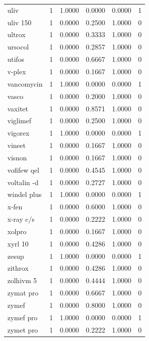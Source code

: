\begin{longtable}{p{3.0cm}rrrrr}
uliv & 1 & 1.0000 & 0.0000 & 0.0000 & 1 \\
uliv 150 & 1 & 0.0000 & 0.2500 & 1.0000 & 0 \\
ultrox & 1 & 0.0000 & 0.3333 & 1.0000 & 0 \\
ursocol & 1 & 0.0000 & 0.2857 & 1.0000 & 0 \\
utifos & 1 & 0.0000 & 0.6667 & 1.0000 & 0 \\
v-plex & 1 & 0.0000 & 0.1667 & 1.0000 & 0 \\
vancomycin & 1 & 1.0000 & 0.0000 & 0.0000 & 1 \\
vasco & 1 & 0.0000 & 0.2000 & 1.0000 & 0 \\
vaxitet & 1 & 0.0000 & 0.8571 & 1.0000 & 0 \\
viglimef & 1 & 0.0000 & 0.2500 & 1.0000 & 0 \\
vigorex & 1 & 1.0000 & 0.0000 & 0.0000 & 1 \\
vineet & 1 & 0.0000 & 0.1667 & 1.0000 & 0 \\
visnon & 1 & 0.0000 & 0.1667 & 1.0000 & 0 \\
vofifew qel & 1 & 0.0000 & 0.4545 & 1.0000 & 0 \\
voltalin -d & 1 & 0.0000 & 0.2727 & 1.0000 & 0 \\
windel plus & 1 & 1.0000 & 0.0000 & 0.0000 & 1 \\
x-fen & 1 & 0.0000 & 0.6000 & 1.0000 & 0 \\
x-ray c/s & 1 & 0.0000 & 0.2222 & 1.0000 & 0 \\
xolpro & 1 & 0.0000 & 0.1667 & 1.0000 & 0 \\
xyrl 10 & 1 & 0.0000 & 0.4286 & 1.0000 & 0 \\
zesup & 1 & 1.0000 & 0.0000 & 0.0000 & 1 \\
zithrox & 1 & 0.0000 & 0.4286 & 1.0000 & 0 \\
zolhivm 5 & 1 & 0.0000 & 0.4444 & 1.0000 & 0 \\
zymat pro & 1 & 0.0000 & 0.6667 & 1.0000 & 0 \\
zymef & 1 & 0.0000 & 0.8000 & 1.0000 & 0 \\
zymef pro & 1 & 1.0000 & 0.0000 & 0.0000 & 1 \\
zymet pro & 1 & 0.0000 & 0.2222 & 1.0000 & 0 \\
\end{longtable}
\endgroup
